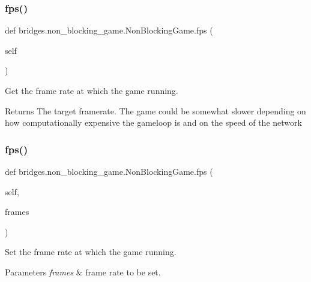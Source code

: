 \subsubsection{\texorpdfstring{fps()}{fps()}\hspace{0.1cm}{\footnotesize\ttfamily [1/2]}}
{\footnotesize\ttfamily def bridges.\+non\+\_\+blocking\+\_\+game.\+Non\+Blocking\+Game.\+fps (\begin{DoxyParamCaption}\item[{}]{self }\end{DoxyParamCaption})}



Get the frame rate at which the game running. 

\begin{DoxyReturn}{Returns}
The target framerate. The game could be somewhat slower depending on how computationally expensive the gameloop is and on the speed of the network 
\end{DoxyReturn}
\mbox{\label{classbridges_1_1non__blocking__game_1_1_non_blocking_game_a46b4b4a25c7c7ffc78126a7b693b7ceb}} 
\subsubsection{\texorpdfstring{fps()}{fps()}\hspace{0.1cm}{\footnotesize\ttfamily [2/2]}}
{\footnotesize\ttfamily def bridges.\+non\+\_\+blocking\+\_\+game.\+Non\+Blocking\+Game.\+fps (\begin{DoxyParamCaption}\item[{}]{self,  }\item[{}]{frames }\end{DoxyParamCaption})}



Set the frame rate at which the game running. 


\begin{DoxyParams}{Parameters}
{\em frames} & frame rate to be set. \\
\hline
\end{DoxyParams}
\mbox{\label{classbridges_1_1non__blocking__game_1_1_non_blocking_game_a7076d0ff62aeba49a0caf71e213361db}} 
